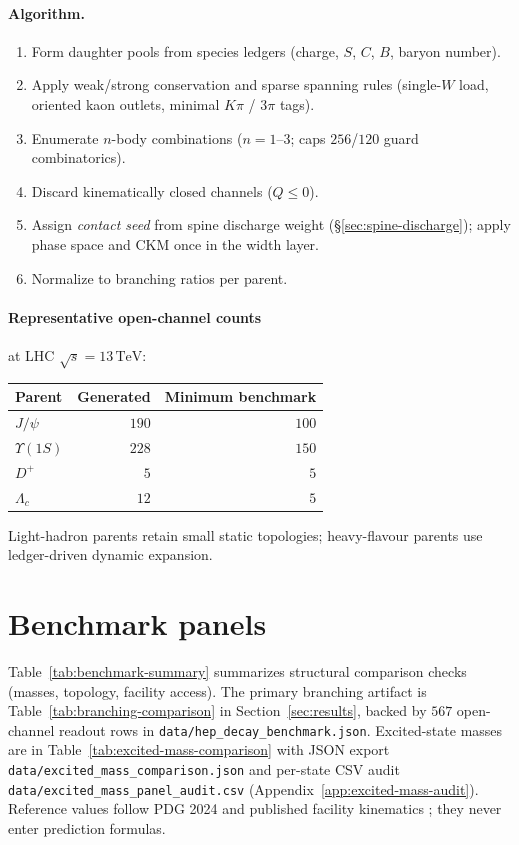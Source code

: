 \documentclass[11pt]{amsart}
\begin{document}
\paragraph{Algorithm.}
\begin{enumerate}[leftmargin=2em]
\item Form daughter pools from species ledgers (charge, $S$, $C$, $B$, baryon number).
\item Apply weak/strong conservation and sparse spanning rules (single-$W$ load,
  oriented kaon outlets, minimal $K\pi$ / $3\pi$ tags).
\item Enumerate $n$-body combinations ($n=1$--$3$; caps $256$/$120$ guard combinatorics).
\item Discard kinematically closed channels ($Q\le 0$).
\item Assign \emph{contact seed} from spine discharge weight
  (\S\ref{sec:spine-discharge}); apply phase space
  and CKM once in the width layer.
\item Normalize to branching ratios per parent.
\end{enumerate}

\paragraph{Representative open-channel counts} at LHC $\sqrt{s}=13\,\mathrm{TeV}$:
\begin{center}
\begin{tabular}{@{}lrr@{}}
\toprule
Parent & Generated & Minimum benchmark \\
\midrule
$J/\psi$ & $190$ & $100$ \\
$\Upsilon(1S)$ & $228$ & $150$ \\
$D^+$ & $5$ & $5$ \\
$\Lambda_c$ & $12$ & $5$ \\
\bottomrule
\end{tabular}
\end{center}

Light-hadron parents retain small static topologies; heavy-flavour parents use
ledger-driven dynamic expansion.

\section{Benchmark panels}
\label{app:benchmark}

Table~\ref{tab:benchmark-summary} summarizes structural comparison checks
(masses, topology, facility access).
The primary branching artifact is Table~\ref{tab:branching-comparison} in
Section~\ref{sec:results}, backed by $567$ open-channel readout rows in
\texttt{data/hep\_decay\_benchmark.json}.
Excited-state masses are in Table~\ref{tab:excited-mass-comparison} with JSON export
\texttt{data/excited\_mass\_comparison.json} and per-state CSV audit
\texttt{data/excited\_mass\_panel\_audit.csv} (Appendix~\ref{app:excited-mass-audit}).
Reference values follow PDG 2024 \cite{pdg2024} and published facility kinematics
\cite{belle2002,cms2018}; they never enter prediction formulas.
\end{document}
